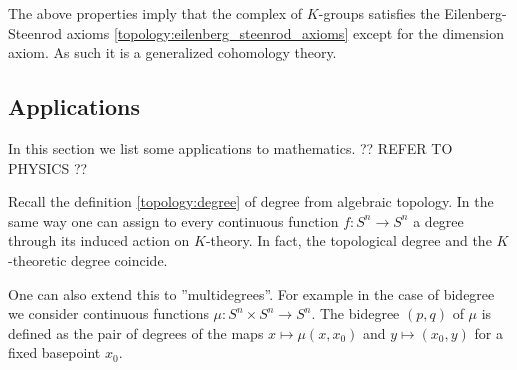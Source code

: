 {    \begin{remark}
        The above properties imply that the complex of $K$-groups satisfies the Eilenberg-Steenrod axioms \ref{topology:eilenberg_steenrod_axioms} except for the dimension axiom. As such it is a generalized cohomology theory.
    \end{remark}

\subsection{Applications}

    In this section we list some applications to mathematics. ?? REFER TO PHYSICS ??

    \begin{property}[Degree]
        Recall the definition \ref{topology:degree} of degree from algebraic topology. In the same way one can assign to every continuous function $f:S^n\rightarrow S^n$ a degree through its induced action on $K$-theory. In fact, the topological degree and the $K$-theoretic degree coincide.

        One can also extend this to ''multidegrees''. For example in the case of bidegree we consider continuous functions $\mu:S^n\times S^n\rightarrow S^n$. The bidegree $(p,q)$ of $\mu$ is defined as the pair of degrees of the maps $x\mapsto\mu(x,x_0)$ and $y\mapsto(x_0,y)$ for a fixed basepoint $x_0$.
    \end{property}


}
